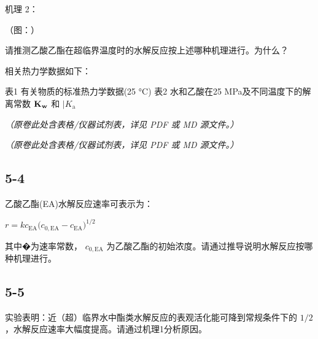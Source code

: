 机理 2：

（图：）

请推测⼄酸⼄酯在超临界温度时的⽔解反应按上述哪种机理进⾏。为什么？

相关热⼒学数据如下：

表1 有关物质的标准热⼒学数据(25 °C)
表2 ⽔和⼄酸在25 MPa及不同温度下的解离常数 ${ \bf K } _ { \bf w }$ 和 $\lvert K _ { \mathrm { a } }$

\textit{（原卷此处含表格/仪器试剂表，详见 PDF 或 MD 源文件。）}

\textit{（原卷此处含表格/仪器试剂表，详见 PDF 或 MD 源文件。）}

\subsection*{5-4}
⼄酸⼄酯(EA)⽔解反应速率可表⽰为：

$
r = k c _ {\mathrm{EA}} \big (c _ {0, \mathrm{EA}} - c _ {\mathrm{EA}} \big) ^ {1 / 2}
$

其中�为速率常数， $c _ { 0 , \mathrm { E A } }$ 为⼄酸⼄酯的初始浓度。请通过推导说明⽔解反应按哪种机理进⾏。

\subsection*{5-5}
实验表明：近（超）临界⽔中酯类⽔解反应的表观活化能可降到常规条件下的 $1 / 2$ ，⽔解反应速率⼤幅度提⾼。请通过机理1分析原因。
